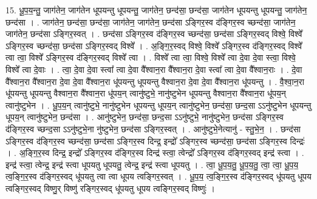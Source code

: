 \documentclass[17pt]{extarticle}
\begin{document}
15. धू॒प॒य॒न्तु॒ जाग॑तेन॒ जाग॑तेन धूपयन्तु धूपयन्तु॒ जाग॑तेन॒ छन्द॑सा॒ छन्द॑सा॒ जाग॑तेन धूपयन्तु धूपयन्तु॒ जाग॑तेन॒ छन्द॑सा । . जाग॑तेन॒ छन्द॑सा॒ छन्द॑सा॒ जाग॑तेन॒ जाग॑तेन॒ छन्द॑सा ऽङ्गिर॒स्व द॑ङ्गिर॒स्व च्छन्द॑सा॒ जाग॑तेन॒ जाग॑तेन॒ छन्द॑सा ऽङ्गिर॒स्वत् । . छन्द॑सा ऽङ्गिर॒स्व द॑ङ्गिर॒स्व च्छन्द॑सा॒ छन्द॑सा ऽङ्गिर॒स्वद् विश्वे॒ विश्वे᳚ ऽङ्गिर॒स्व च्छन्द॑सा॒ छन्द॑सा ऽङ्गिर॒स्वद् विश्वे᳚ । . अ॒ङ्गि॒र॒स्वद् विश्वे॒ विश्वे᳚ ऽङ्गिर॒स्व द॑ङ्गिर॒स्वद् विश्वे᳚ त्वा त्वा॒ विश्वे᳚ ऽङ्गिर॒स्व द॑ङ्गिर॒स्वद् विश्वे᳚ त्वा । . विश्वे᳚ त्वा त्वा॒ विश्वे॒ विश्वे᳚ त्वा दे॒वा दे॒वा स्त्वा॒ विश्वे॒ विश्वे᳚ त्वा दे॒वाः । . त्वा॒ दे॒वा दे॒वा स्त्वा᳚ त्वा दे॒वा वै᳚श्वान॒रा वै᳚श्वान॒रा दे॒वा स्त्वा᳚ त्वा दे॒वा वै᳚श्वान॒राः । . दे॒वा वै᳚श्वान॒रा वै᳚श्वान॒रा दे॒वा दे॒वा वै᳚श्वान॒रा धू॑पयन्तु धूपयन्तु वैश्वान॒रा दे॒वा दे॒वा वै᳚श्वान॒रा धू॑पयन्तु । . वै॒श्वा॒न॒रा धू॑पयन्तु धूपयन्तु वैश्वान॒रा वै᳚श्वान॒रा धू॑पय॒न् त्वानु॑ष्टुभे॒ नानु॑ष्टुभेन धूपयन्तु वैश्वान॒रा वै᳚श्वान॒रा धू॑पय॒न् त्वानु॑ष्टुभेन । . धू॒प॒य॒न् त्वानु॑ष्टुभे॒ नानु॑ष्टुभेन धूपयन्तु धूपय॒न् त्वानु॑ष्टुभेन॒ छन्द॑सा॒ छन्द॒सा ऽऽनु॑ष्टुभेन धूपयन्तु धूपय॒न् त्वानु॑ष्टुभेन॒ छन्द॑सा । . आनु॑ष्टुभेन॒ छन्द॑सा॒ छन्द॒सा ऽऽनु॑ष्टुभे॒ नानु॑ष्टुभेन॒ छन्द॑सा ऽङ्गिर॒स्व द॑ङ्गिर॒स्व च्छन्द॒सा ऽऽनु॑ष्टुभे॒ना नु॑ष्टुभेन॒ छन्द॑सा ऽङ्गिर॒स्वत् । . आनु॑ष्टुभे॒नेत्यानु॑ - स्तु॒भे॒न॒ । . छन्द॑सा ऽङ्गिर॒स्व द॑ङ्गिर॒स्व च्छन्द॑सा॒ छन्द॑सा ऽङ्गिर॒स्व दिन्द्र॒ इन्द्रो᳚ ऽङ्गिर॒स्व च्छन्द॑सा॒ छन्द॑सा ऽङ्गिर॒स्व दिन्द्रः॑ । . अ॒ङ्गि॒र॒स्व दिन्द्र॒ इन्द्रो᳚ ऽङ्गिर॒स्व द॑ङ्गिर॒स्व दिन्द्र॑ स्त्वा॒ त्वेन्द्रो᳚ ऽङ्गिर॒स्व द॑ङ्गिर॒स्वद् इन्द्र॑ स्त्वा । . इन्द्र॑ स्त्वा॒ त्वेन्द्र॒ इन्द्र॑ स्त्वा धूपयतु धूपयतु॒ त्वेन्द्र॒ इन्द्र॑ स्त्वा धूपयतु । . त्वा॒ धू॒प॒य॒तु॒ धू॒प॒य॒तु॒ त्वा॒ त्वा॒ धू॒प॒य॒ त्व॒ङ्गि॒र॒स्व द॑ङ्गिर॒स्वद् धू॑पयतु त्वा त्वा 
धूपय  त्वङ्गिर॒स्वत् । . धू॒प॒य॒ त्व॒ङ्गि॒र॒स्व द॑ङ्गिर॒स्वद् धू॑पयतु धूपय त्वङ्गिर॒स्वद् विष्णु॒र् विष्णु॑ रङ्गिर॒स्वद् धू॑पयतु धूपय त्वङ्गिर॒स्वद् विष्णुः॑ । \newline
\end{document}

